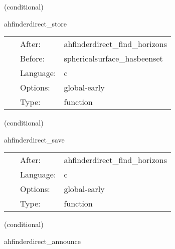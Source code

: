 \vspace{5mm}

   (conditional) 

\hspace{5mm} ahfinderdirect\_store 

\hspace{5mm}{\it store apparent horizon(s) into spherical surface(s) } 


\hspace{5mm}

 \begin{tabular*}{160mm}{cll} 
~ & After:  & ahfinderdirect\_find\_horizons \\ 
~ & Before:  & sphericalsurface\_hasbeenset \\ 
~ & Language:  & c \\ 
~ & Options:  & global-early \\ 
~ & Type:  & function \\ 
\end{tabular*} 


\vspace{5mm}

   (conditional) 

\hspace{5mm} ahfinderdirect\_save 

\hspace{5mm}{\it save apparent horizon(s) into cactus variables } 


\hspace{5mm}

 \begin{tabular*}{160mm}{cll} 
~ & After:  & ahfinderdirect\_find\_horizons \\ 
~ & Language:  & c \\ 
~ & Options:  & global-early \\ 
~ & Type:  & function \\ 
\end{tabular*} 


\vspace{5mm}

   (conditional) 

\hspace{5mm} ahfinderdirect\_announce 

\hspace{5mm}{\it announce horizon position(s) to other thorns } 


\hspace{5mm}

